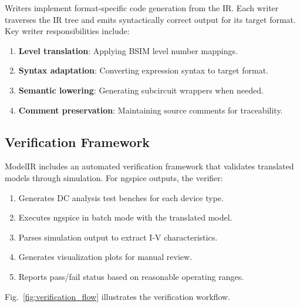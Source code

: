 \documentclass[conference]{IEEEtran}
\begin{document}
Writers implement format-specific code generation from the IR. Each writer traverses the IR tree and emits syntactically correct output for its target format. Key writer responsibilities include:

\begin{enumerate}
    \item \textbf{Level translation}: Applying BSIM level number mappings.
    \item \textbf{Syntax adaptation}: Converting expression syntax to target format.
    \item \textbf{Semantic lowering}: Generating subcircuit wrappers when needed.
    \item \textbf{Comment preservation}: Maintaining source comments for traceability.
\end{enumerate}

\subsection{Verification Framework}
\label{sec:verification}

ModelIR includes an automated verification framework that validates translated models through simulation. For ngspice outputs, the verifier:

\begin{enumerate}
    \item Generates DC analysis test benches for each device type.
    \item Executes ngspice in batch mode with the translated model.
    \item Parses simulation output to extract I-V characteristics.
    \item Generates visualization plots for manual review.
    \item Reports pass/fail status based on reasonable operating ranges.
\end{enumerate}

Fig.~\ref{fig:verification_flow} illustrates the verification workflow.
\end{document}
